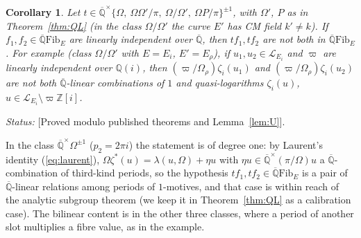 \documentclass[11pt]{amsart}
\newtheorem{corollary}[theorem]{Corollary}
\theoremstyle{definition}
\newcommand{\Qb}{\overline{\mathbb{Q}}}
\newcommand{\Q}{\mathbb{Q}}
\newcommand{\Z}{\mathbb{Z}}
\newcommand{\Lg}{\mathcal{L}}
\newcommand{\vp}{\varpi}
\newcommand{\Fib}{\mathrm{Fib}}
\newcommand{\lab}[1]{\textup{[#1]}}
\newcommand{\LabC}{\lab{Proved modulo published theorems and Lemma~\ref{lem:U}}}
\newcommand{\Status}{\noindent\emph{Status:} }
\begin{document}
\begin{corollary}\label{cor:QL}
Let $t\in\Qb^\times\{\Omega,\ \Omega\Omega'/\pi,\ \Omega/\Omega',\ \Omega P/\pi\}^{\pm1}$, with $\Omega'$, $P$ as in
Theorem~\ref{thm:QL} (in the class $\Omega/\Omega'$ the curve $E'$ has CM field $k'\neq k$). If $f_1,f_2\in\Qb\Fib_E$ are
linearly independent over $\Qb$, then $tf_1,tf_2$ are not both in $\Qb\Fib_E$. For example (class $\Omega/\Omega'$ with
$E=E_i$, $E'=E_\rho$), if $u_1,u_2\in\Lg_{E_i}$ and $\vp$ are linearly independent over $\Q(i)$, then
$(\vp/\Omega_\rho)\zeta_i(u_1)$ and $(\vp/\Omega_\rho)\zeta_i(u_2)$ are not both $\Qb$-linear combinations of $1$ and
quasi-logarithms $\zeta_i(u)$, $u\in\Lg_{E_i}\setminus\vp\Z[i]$.
\end{corollary}

\Status \LabC.

\noindent In the class $\Qb^\times\Omega^{\pm1}$ ($p_2=2\pi i$) the statement is of degree one: by Laurent's identity
(\ref{eq:laurent}), $\Omega\zeta^*(u)=\lambda(u,\Omega)+\eta u$ with $\eta u\in\Qb^\times(\pi/\Omega)u$ a $\Qb$-combination of
third-kind periods, so the hypothesis $tf_1,tf_2\in\Qb\Fib_E$ is a pair of $\Qb$-linear relations among periods of
$1$-motives, and that case is within reach of the analytic subgroup theorem (we keep it in Theorem~\ref{thm:QL} as a
calibration case). The bilinear content is in the other three classes, where a period of another slot multiplies a
fibre value, as in the example.
\end{document}
